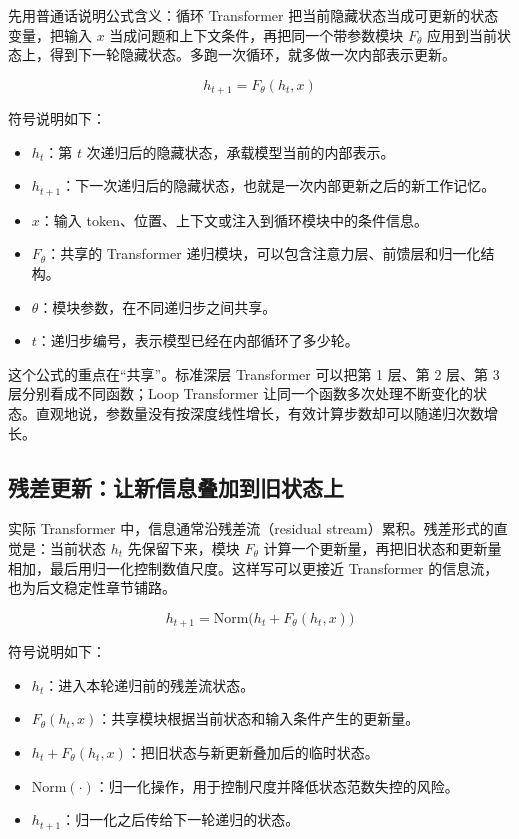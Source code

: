 先用普通话说明公式含义：循环 Transformer 把当前隐藏状态当成可更新的状态变量，把输入 \(x\) 当成问题和上下文条件，再把同一个带参数模块 \(F_\theta\) 应用到当前状态上，得到下一轮隐藏状态。多跑一次循环，就多做一次内部表示更新。

$$
h_{t+1}=F_\theta(h_t,x)
$$

符号说明如下：
\begin{itemize}
    \item \(h_t\)：第 \(t\) 次递归后的隐藏状态，承载模型当前的内部表示。
    \item \(h_{t+1}\)：下一次递归后的隐藏状态，也就是一次内部更新之后的新工作记忆。
    \item \(x\)：输入 token、位置、上下文或注入到循环模块中的条件信息。
    \item \(F_\theta\)：共享的 Transformer 递归模块，可以包含注意力层、前馈层和归一化结构。
    \item \(\theta\)：模块参数，在不同递归步之间共享。
    \item \(t\)：递归步编号，表示模型已经在内部循环了多少轮。
\end{itemize}

这个公式的重点在“共享”。标准深层 Transformer 可以把第 1 层、第 2 层、第 3 层分别看成不同函数；Loop Transformer 让同一个函数多次处理不断变化的状态。直观地说，参数量没有按深度线性增长，有效计算步数却可以随递归次数增长。

\subsection{残差更新：让新信息叠加到旧状态上}

实际 Transformer 中，信息通常沿残差流（residual stream）累积。残差形式的直觉是：当前状态 \(h_t\) 先保留下来，模块 \(F_\theta\) 计算一个更新量，再把旧状态和更新量相加，最后用归一化控制数值尺度。这样写可以更接近 Transformer 的信息流，也为后文稳定性章节铺路。

$$
h_{t+1}=\mathrm{Norm}\bigl(h_t+F_\theta(h_t,x)\bigr)
$$

符号说明如下：
\begin{itemize}
    \item \(h_t\)：进入本轮递归前的残差流状态。
    \item \(F_\theta(h_t,x)\)：共享模块根据当前状态和输入条件产生的更新量。
    \item \(h_t+F_\theta(h_t,x)\)：把旧状态与新更新叠加后的临时状态。
    \item \(\mathrm{Norm}(\cdot)\)：归一化操作，用于控制尺度并降低状态范数失控的风险。
    \item \(h_{t+1}\)：归一化之后传给下一轮递归的状态。
\end{itemize}

